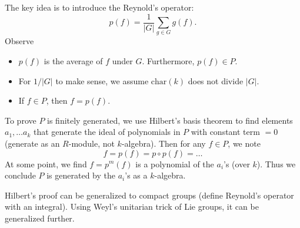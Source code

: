 The key idea is to introduce the Reynold's operator:
\[
    p(f) = \frac{1}{|G|} \sum_{g \in G} g(f).
\]
Observe
\begin{itemize}
    \item $p(f)$ is the average of $f$ under $G$. Furthermore, $p(f) \in P$.
    \item For $1/|G|$ to make sense, we assume $\text{char}(k)$ does not divide $|G|$.
    \item If $f \in P$, then $f = p(f)$.
\end{itemize}
To prove $P$ is finitely generated, we use Hilbert's basis theorem to find elements $a_1, \dots a_k$ that generate the ideal of polynomials in $P$ with constant term $ = 0$ (generate as an $R$-module, not $k$-algebra). Then for any $f \in P$, we note
\[
    f = p(f) = p \circ p(f) = \dots
\]
At some point, we find $f = p^m(f)$ is a polynomial of the $a_i$'s (over $k$). Thus we conclude $P$ is generated by the $a_i$'s as a $k$-algebra.

Hilbert's proof can be generalized to compact groups (define Reynold's operator with an integral). Using Weyl's unitarian trick of Lie groups, it can be generalized further.

